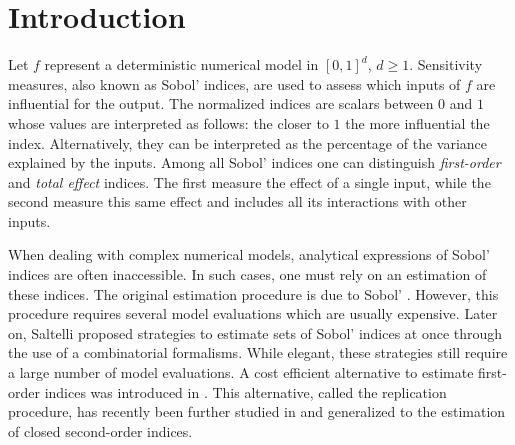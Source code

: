 %
%

\section{Introduction}
\label{sec:1}

Let $f$ represent a deterministic numerical model in $[0,1]^d$, $d \geq 1$. Sensitivity measures, also known as Sobol' indices, are used to assess which inputs of $f$ are influential for the output. The normalized indices are scalars between $0$ and $1$ whose values are interpreted as follows: the closer to $1$ the more influential the index. Alternatively, they can be interpreted as the percentage of the variance explained by the inputs. Among all Sobol' indices one can distinguish \emph{first-order} and \emph{total effect} indices. The first measure the effect of a single input, while the second measure this same effect and includes all its interactions with other inputs.

When dealing with complex numerical models, analytical expressions of Sobol' indices are often inaccessible. In such cases, one must rely on an estimation of these indices. The original estimation procedure is due to Sobol' \cite{Sobol'}. However, this procedure requires several model evaluations which are usually expensive. Later on, Saltelli \cite{Saltelli} proposed strategies to estimate sets of Sobol' indices at once through the use of a combinatorial formalisms. While elegant, these strategies still require a large number of model evaluations.  A cost efficient alternative to estimate first-order indices was introduced in \cite{Mara}. This alternative, called the replication procedure, has recently been further studied  in \cite{Tissot} and generalized to the estimation of closed second-order indices.


